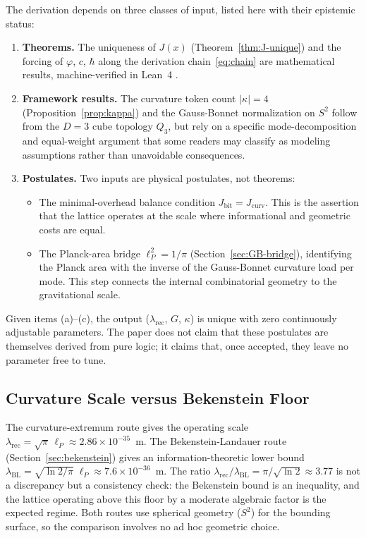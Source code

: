 \documentclass[12pt]{article}
\theoremstyle{definition}
\theoremstyle{remark}
\begin{document}
The derivation depends on three classes of input, listed here with
their epistemic status:
\begin{enumerate}[label=(\alph*)]
  \item \textbf{Theorems.}  The uniqueness of $J(x)$
    (Theorem~\ref{thm:J-unique}) and the forcing of $\varphi$, $c$,
    $\hbar$ along the derivation chain~\eqref{eq:chain} are
    mathematical results, machine-verified in Lean~4
    \cite{WashburnLean4Repo2026}.
  \item \textbf{Framework results.}  The curvature token count
    $|\kappa| = 4$ (Proposition~\ref{prop:kappa}) and the
    Gauss-Bonnet normalization on $S^2$ follow from the $D = 3$ cube
    topology $Q_3$, but rely on a specific mode-decomposition and
    equal-weight argument that some readers may classify as modeling
    assumptions rather than unavoidable consequences.
  \item \textbf{Postulates.}  Two inputs are physical postulates, not
    theorems:
    \begin{itemize}
      \item The minimal-overhead balance condition
        $J_{\mathrm{bit}} = J_{\mathrm{curv}}$. This is the
        assertion that the lattice operates at the scale where
        informational and geometric costs are equal.
      \item The Planck-area bridge $\ell_P^2 = 1/\pi$
        (Section~\ref{sec:GB-bridge}), identifying the Planck area
        with the inverse of the Gauss-Bonnet curvature load per mode.
        This step connects the internal combinatorial geometry to the
        gravitational scale.
    \end{itemize}
\end{enumerate}
Given items (a)--(c), the output ($\lambda_{\mathrm{rec}}$, $G$,
$\kappa$) is unique with zero continuously adjustable parameters.
The paper does not claim that these postulates are themselves derived
from pure logic; it claims that, once accepted, they leave no
parameter free to tune.

\subsection{Curvature Scale versus Bekenstein Floor}

The curvature-extremum route gives the operating scale
$\lambda_{\mathrm{rec}} = \sqrt{\pi}\,\ell_P
\approx 2.86 \times 10^{-35}$~m.
The Bekenstein-Landauer route
(Section~\ref{sec:bekenstein}) gives an information-theoretic lower
bound $\lambda_{\mathrm{BL}} = \sqrt{\ln 2/\pi}\;\ell_P \approx 7.6
\times 10^{-36}$~m.  The ratio
$\lambda_{\mathrm{rec}}/\lambda_{\mathrm{BL}} =
\pi/\sqrt{\ln 2} \approx 3.77$ is not a discrepancy but a consistency
check: the Bekenstein bound is an inequality, and the lattice operating
above this floor by a moderate algebraic factor is the expected regime.
Both routes use spherical geometry ($S^2$) for the bounding surface, so
the comparison involves no ad hoc geometric choice.
\end{document}
